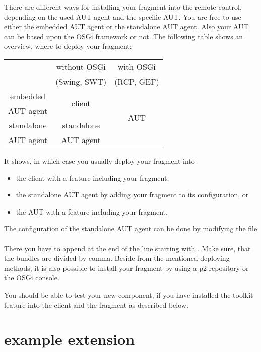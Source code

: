 There are different ways for installing your fragment into the \app{} remote
control, depending on the used AUT agent and the specific AUT. You are free to
use either the embedded AUT agent or the standalone AUT agent. Also your AUT
can be based upon the OSGi framework or not. The following table shows an
overview, where to deploy your fragment:

\begin{center}
\begin{tabular}{|c||c|c|}
\hline
~ & without OSGi & with OSGi\\
~ & (Swing, SWT) & (RCP, GEF)\\
\hline\hline
embedded & \multirow{2}{*}{\app{} client} & \multirow{4}{*}{AUT}\\
AUT agent & & \\
\hhline{--~}
standalone & standalone & \\
AUT agent  & AUT agent  & \\
\hline
\end{tabular}
\end{center}

It shows, in which case you usually deploy your fragment into
\begin{itemize}
  \item the \app{} client with a feature including your fragment,
  \item the standalone AUT agent by adding your fragment to its configuration,
        or
  \item the AUT with a feature including your fragment.
\end{itemize}

The configuration of the standalone AUT agent can be done by modifying the
file\\
\\
There you have to append  at the end of the line
starting with . Make sure, that the bundles are divided
by comma. Beside from the mentioned deploying methods, it is also possible
to install your fragment by using a p2 repository or the OSGi console.

You should be able to test your new component, if you have installed the
toolkit feature into the \app{} client and the fragment as described below.

\section{\app{} example extension}
\label{remoteControlExamples}

